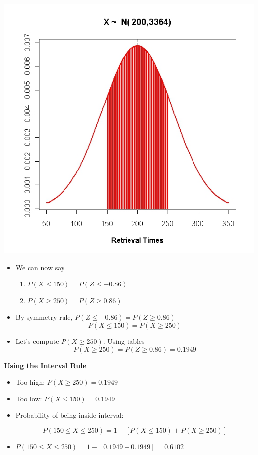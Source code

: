\documentclass[a4paper,12pt]{article}
\begin{document}
	\begin{center}
		\includegraphics[scale=0.40]{images/5BNormal3}
	\end{center}
	
	\begin{itemize}
		\item We can now say
		\begin{enumerate}
		    \item $P( X \leq 150) = P( Z \leq -0.86)$
		\item $P( X \geq 250) = P( Z \geq 0.86)$
		\end{enumerate}

		\item By symmetry rule, $P( Z \leq -0.86) = P( Z \geq 0.86)$
		\[ P( X \leq 150) =  P( X \geq 250) \]
		\item Let's compute $P( X \geq 250)$. Using tables
		\[P( X \geq 250) = P( Z \geq 0.86) = 0.1949 \]
	\end{itemize}


	
	\textbf{Using the Interval Rule}
	\begin{itemize}
		\item Too high: $P( X \geq 250) = 0.1949 $
		\item Too low:  $P( X \leq 150) = 0.1949 $
		\item Probability of being inside interval:
		
		\[ P(150 \leq X \leq 250) = 1- [ P( X \leq 150) + P( X \geq 250)] \]
		
		\item $P(150 \leq X \leq 250) = 1- [ 0.1949 + 0.1949 ] = \boldsymbol{0.6102}$
		
	\end{itemize}	
	
\end{document}
